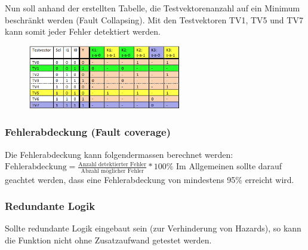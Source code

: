 Nun soll anhand der erstellten Tabelle, die Testvektorenanzahl auf ein Minimum beschränkt werden (Fault Collapsing). Mit den Testvektoren TV1, TV5 und TV7 kann somit jeder Fehler detektiert werden.
\begin{figure}[H]
    \includegraphics[width=0.6\textwidth]{images/stuckat_detektion_2.png}
\end{figure}

\subsubsection{Fehlerabdeckung (Fault coverage)}
Die Fehlerabdeckung kann folgendermassen berechnet werden: $\text{Fehlerabdeckung}=\frac{\text{Anzahl detektierter Fehler}}{\text{Abzahl möglicher Fehler}}*100\%$ Im Allgemeinen sollte darauf geachtet werden, dass eine Fehlerabdeckung von mindestens 95\% erreicht wird.

\subsubsection{Redundante Logik}
Sollte redundante Logik eingebaut sein (zur Verhinderung von Hazards), so kann die Funktion nicht ohne Zusatzaufwand getestet werden.

